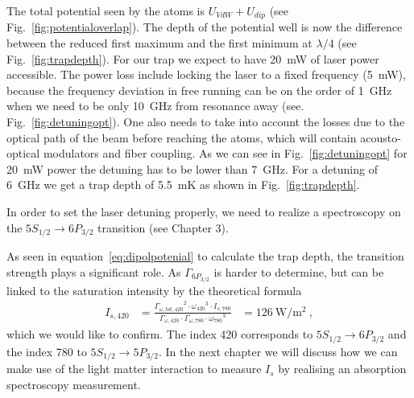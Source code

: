 The total potential seen by the atoms is \(U_{VdW} + U_{dip} \) 
(see Fig.~\ref{fig:potentialoverlap}). The depth of the potential well is now the 
difference between the reduced first maximum and the first minimum at \(\lambda/4 \)
(see Fig.~\ref{fig:trapdepth}). 
For our trap we expect to have \SI{20}{\milli\watt} of laser power accessible. 
The power loss include locking the laser to a fixed frequency (\SI{5}{\milli\watt}), 
because the frequency deviation in free running can be on the order of 
\SI{1}{\giga\hertz} when we need to be only \SI{10}{\giga\hertz} from resonance 
away (see. Fig.~\ref{fig:detuningopt}). One also needs to take into account the 
losses due to the optical path of the beam before reaching the atoms, which will 
contain acousto-optical modulators and fiber coupling. As we can see in 
Fig.~\ref{fig:detuningopt} for \SI{20}{\milli\watt} power the detuning has to be 
lower than \SI{7}{\giga\hertz}. For a detuning of \SI{6}{\giga\hertz} we get a trap 
depth of \SI{5.5}{\milli\kelvin} as shown in Fig.~\ref{fig:trapdepth}.

In order to set the laser detuning properly, we need to realize a spectroscopy 
on the \(5S_{1/2} \rightarrow 6P_{3/2} \) transition (see Chapter 3).

As seen in equation~\ref{eq:dipolpotenial} to calculate the trap depth, the 
transition strength plays a significant role. As \(\Gamma_{6P_{3/2}}\) is harder
to determine, but can be linked to the saturation intensity by the theoretical
formula
\begin{align}
    I_{s,420} &= \frac{{\Gamma_{\omega,tot,420}}^2\cdot{\omega_{420}}^3\cdot I_{s,780}}
    {\Gamma_{\omega,420}\cdot\Gamma_{\omega,780}\cdot{\omega_{780}}^3} 
    &= \SI{126}{\watt\per\meter\squared}~,
\end{align} 
which we would like to confirm. The index 420 corresponds to 
\(5S_{1/2} \rightarrow 6P_{3/2} \) and the index 780 to 
\(5S_{1/2} \rightarrow 5P_{3/2} \). In the next chapter we will discuss how we 
can make use of the light matter interaction to measure \(I_s\) by realising an 
absorption spectroscopy measurement.

